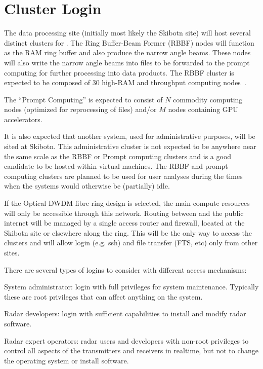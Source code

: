\documentclass[12pt,a4paper]{article}
\begin{document}
\section{Cluster Login}
\label{sec:cluster}

The data processing site (initially most likely the Skibotn site) will host several distinct clusters for \ED.
The Ring Buffer-Beam Former (RBBF) nodes will function as the RAM ring buffer and also produce the narrow angle beams.
These nodes will also write the narrow angle beams into files to be forwarded to the prompt computing for further processing into data products.
The RBBF cluster is expected to be composed of $30$ high-RAM and throughput computing nodes~\cite{amd-epyc}.

The ``Prompt Computing'' is expected to consist of $N$ commodity computing nodes (optimized for reprocessing of files) and/or $M$ nodes containing
GPU accelerators.

It is also expected that another system, used for administrative purposes, will be sited at Skibotn. This administrative cluster is not expected to be anywhere near the same scale as the RBBF or Prompt computing clusters
and is a good candidate to be hosted within virtual machines.
The RBBF and prompt computing clusters are planned to be used for \ED user analyses during the times when the systems would otherwise be (partially) idle.

If the Optical DWDM fibre ring design is selected, the main \ED compute resources will only be accessible through this network. Routing between \ED and the public internet will be managed by a single access router and firewall, located at the Skibotn site or elsewhere along the ring.
This will be the only way to access the clusters and will allow login (e.g. ssh) and file transfer (FTS, etc) only from other \EC sites. 

There are several types of logins to consider with different access mechanisms:
\bitm
\item System administrator: login with full privileges for system maintenance. Typically these are root privileges that can affect anything on the system.

\item Radar developers: login with sufficient capabilities to install and modify radar software.

\item Radar expert operators: radar users and developers with non-root privileges to control all aspects of the transmitters and receivers in realtime, but not to change the operating system or install software.
\end{document}
